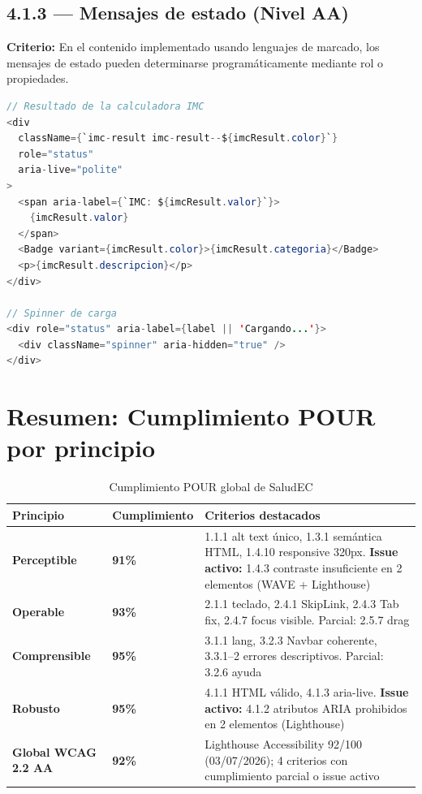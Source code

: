 \documentclass[12pt, a4paper]{article}
\begin{document}
\subsection{4.1.3 --- Mensajes de estado (Nivel AA)}

\textbf{Criterio:} En el contenido implementado usando lenguajes de marcado, los mensajes de estado pueden determinarse programáticamente mediante rol o propiedades.

\begin{evidbox}
\begin{lstlisting}[language=Java]
// Resultado de la calculadora IMC
<div
  className={`imc-result imc-result--${imcResult.color}`}
  role="status"
  aria-live="polite"
>
  <span aria-label={`IMC: ${imcResult.valor}`}>
    {imcResult.valor}
  </span>
  <Badge variant={imcResult.color}>{imcResult.categoria}</Badge>
  <p>{imcResult.descripcion}</p>
</div>

// Spinner de carga
<div role="status" aria-label={label || 'Cargando...'}>
  <div className="spinner" aria-hidden="true" />
</div>
\end{lstlisting}
\end{evidbox}

\section{Resumen: Cumplimiento POUR por principio}

\begin{table}[H]
\centering
\caption{Cumplimiento POUR global de SaludEC}
\begin{tabular}{@{}>{\bfseries\color{navydeep}}p{3cm} >{\centering\arraybackslash}p{2.5cm} p{8cm}@{}}
\toprule
\rowcolor{royalblue!12}
\textbf{Principio} & \textbf{Cumplimiento} & \textbf{Criterios destacados} \\
\midrule
Perceptible & \textcolor{warningyellow}{\bfseries 91\%} & 1.1.1 alt text único, 1.3.1 semántica HTML, 1.4.10 responsive 320px. \textbf{Issue activo:} 1.4.3 contraste insuficiente en 2 elementos (WAVE + Lighthouse) \\
Operable & \textcolor{successgreen}{\bfseries 93\%} & 2.1.1 teclado, 2.4.1 SkipLink, 2.4.3 Tab fix, 2.4.7 focus visible. Parcial: 2.5.7 drag \\
Comprensible & \textcolor{successgreen}{\bfseries 95\%} & 3.1.1 lang, 3.2.3 Navbar coherente, 3.3.1--2 errores descriptivos. Parcial: 3.2.6 ayuda \\
Robusto & \textcolor{warningyellow}{\bfseries 95\%} & 4.1.1 HTML válido, 4.1.3 aria-live. \textbf{Issue activo:} 4.1.2 atributos ARIA prohibidos en 2 elementos (Lighthouse) \\
\midrule
\textbf{Global WCAG 2.2 AA} & \textcolor{warningyellow}{\bfseries 92\%} & Lighthouse Accessibility 92/100 (03/07/2026); 4 criterios con cumplimiento parcial o issue activo \\
\bottomrule
\end{tabular}
\end{table}
\end{document}
